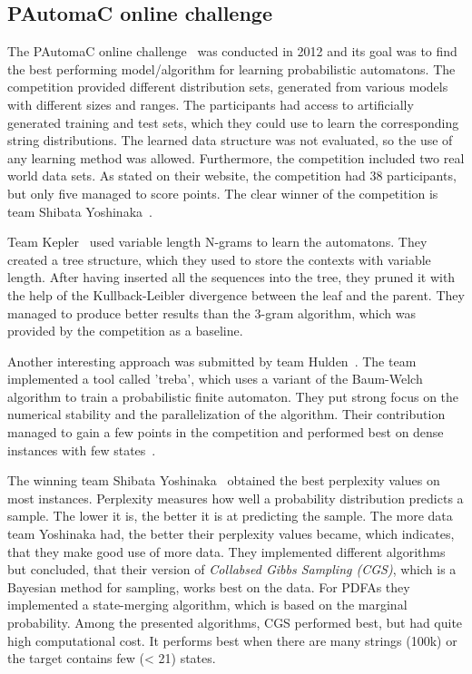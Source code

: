 \documentclass[
a4paper,
12pt
]{scrartcl}
\begin{document}
\subsection{PAutomaC online challenge}
The PAutomaC online challenge~\cite{Verwer.2014} was conducted in 2012 and its goal was to find the best performing model/algorithm for learning probabilistic automatons. The competition provided different distribution sets, generated from various models with different sizes and ranges. The participants had access to artificially generated training and test sets, which they could use to learn the corresponding string distributions. The learned data structure was not evaluated, so the use of any learning method was allowed. Furthermore, the competition included two real world data sets. As stated on their website, the competition had 38 participants, but only five managed to score points. The clear winner of the competition is team Shibata Yoshinaka~\cite{Shibata_the11th}.

Team Kepler~\cite{Kepler} used variable length N-grams to learn the automatons. They created a tree structure, which they used to store the contexts with variable length. After having inserted all the sequences into the tree, they pruned it with the help of the Kullback-Leibler divergence between the leaf and the parent. They managed to produce better results than the 3-gram algorithm, which was provided by the competition as a baseline.

Another interesting approach was submitted by team Hulden~\cite{MansHulden.2012}. The team implemented a tool called 'treba', which uses a variant of the Baum-Welch algorithm to train a probabilistic finite automaton. They put strong focus on the numerical stability and the parallelization of the algorithm. Their contribution managed to gain a few points in the competition and performed best on dense instances with few states~\cite{Verwer.2014}.

The winning team Shibata Yoshinaka~\cite{Shibata_the11th} obtained the best perplexity values on most instances. Perplexity measures how well a probability distribution predicts a sample. The lower it is, the better it is at predicting the sample. The more data team Yoshinaka had, the better their perplexity values became, which indicates, that they make good use of more data. They implemented different algorithms but concluded, that their version of \textit{Collabsed Gibbs Sampling (CGS)}, which is a Bayesian method for sampling, works best on the data. For PDFAs they implemented a state-merging algorithm, which is based on the marginal probability. Among the presented algorithms, CGS performed best, but had quite high computational cost. It performs best when there are many strings (100k) or the target contains few (< 21) states.
\end{document}
